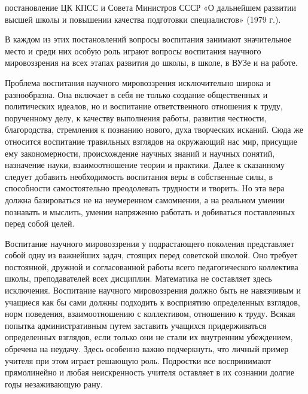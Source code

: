 \documentclass[12pt, a4paper, openany]{book}
\begin{document}
постановление ЦК КПСС и Совета Министров СССР «О дальнейшем развитии высшей школы и повышении  качества подготовки специалистов» (1979 г.). 

В каждом из этих постановлений вопросы воспитания занимают значительное место и среди них особую роль играют вопросы воспитания научного мировоззрения на всех этапах развития до школы, в школе, в ВУЗе и на  работе. 

Проблема воспитания научного мировоззрения  исключительно широка и разнообразна. Она включает в себя не только создание общественных и политических идеалов, но и воспитание ответственного отношения к труду,  порученному делу, к качеству выполнения работы, развития честности, благородства, стремления к познанию нового, духа творческих исканий. Сюда же относится воспитание травильных взглядов на окружающий нас мир, присущие ему закономерности, происхождение научных знаний и научных понятий, назначение науки, взаимоотношение теории и практики. Далее к сказанному следует добавить необходимость воспитания веры в собственные силы, в  способности самостоятельно преодолевать трудности и творить. Но эта вера должна базироваться не на неумеренном  самомнении, а на реальном умении познавать и мыслить, умении напряженно работать и добиваться поставленных перед собой целей. 

Воспитание научного мировоззрения у подрастающего поколения представляет собой одну из важнейших задач, стоящих перед советской школой. Оно требует постоянной, дружной и согласованной работы всего педагогического коллектива школы, преподавателей всех дисциплин.  Математика не составляет здесь исключения. Воспитание  научного мировоззрения должно быть не навязчивым и учащиеся как бы сами должны подходить к восприятию  определенных взглядов, норм поведения, взаимоотношению с коллективом, отношению к труду. Всякая попытка  административным путем заставить учащихся придерживаться определенных взглядов, если только они не стали их  внутренним убеждением, обречена на неудачу. Здесь особенно важно подчеркнуть, что личный пример учителя при этом играет решающую роль. Подростки все воспринимают  прямолинейно и любая неискренность учителя оставляет в их сознании долгие годы незаживающую рану. 
\end{document}
